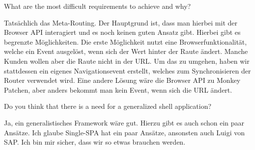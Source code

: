 \begin{description}
    \NicoVogel What are the most difficult requirements to achieve and why?

    \ManfredSteyer Tatsächlich das Meta-Routing. Der Hauptgrund ist, dass man hierbei mit der Browser API interagiert und es noch keinen guten Ansatz gibt. Hierbei gibt es begrenzte Möglichkeiten. Die erste Möglichkeit nutzt eine Browserfunktionalität, welche ein Event ausgelöst, wenn sich der Wert hinter der Raute ändert. Manche Kunden wollen aber die Raute nicht in der URL. Um das zu umgehen, haben wir stattdessen ein eigenes Navigationsevent erstellt, welches zum Synchronisieren der Router verwendet wird. Eine andere Lösung wäre die Browser API zu Monkey Patchen, aber anders bekommt man kein Event, wenn sich die URL ändert.


    \NicoVogel Do you think that there is a need for a generalized shell application?

    \ManfredSteyer Ja, ein generalistisches Framework wäre gut. Hierzu gibt es auch schon ein paar Ansätze. Ich glaube Single-SPA hat ein paar Ansätze, ansonsten auch Luigi von SAP. Ich bin mir sicher, dass wir so etwas brauchen werden.



\end{description}